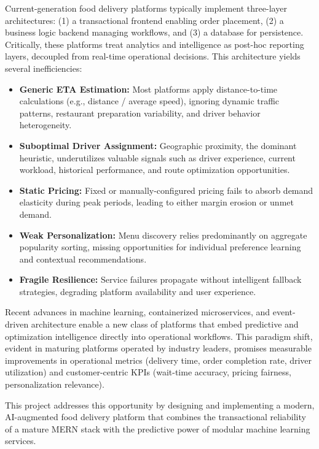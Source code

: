 \documentclass[12pt,a4paper]{report}
\begin{document}
Current-generation food delivery platforms typically implement three-layer architectures: (1) a transactional frontend enabling order placement, (2) a business logic backend managing workflows, and (3) a database for persistence. Critically, these platforms treat analytics and intelligence as post-hoc reporting layers, decoupled from real-time operational decisions. This architecture yields several inefficiencies:

\begin{itemize}
    \item \textbf{Generic ETA Estimation:} Most platforms apply distance-to-time calculations (e.g., distance / average speed), ignoring dynamic traffic patterns, restaurant preparation variability, and driver behavior heterogeneity.
    \item \textbf{Suboptimal Driver Assignment:} Geographic proximity, the dominant heuristic, underutilizes valuable signals such as driver experience, current workload, historical performance, and route optimization opportunities.
    \item \textbf{Static Pricing:} Fixed or manually-configured pricing fails to absorb demand elasticity during peak periods, leading to either margin erosion or unmet demand.
    \item \textbf{Weak Personalization:} Menu discovery relies predominantly on aggregate popularity sorting, missing opportunities for individual preference learning and contextual recommendations.
    \item \textbf{Fragile Resilience:} Service failures propagate without intelligent fallback strategies, degrading platform availability and user experience.
\end{itemize}

Recent advances in machine learning, containerized microservices, and event-driven architecture enable a new class of platforms that embed predictive and optimization intelligence directly into operational workflows. This paradigm shift, evident in maturing platforms operated by industry leaders, promises measurable improvements in operational metrics (delivery time, order completion rate, driver utilization) and customer-centric KPIs (wait-time accuracy, pricing fairness, personalization relevance).

This project addresses this opportunity by designing and implementing a modern, AI-augmented food delivery platform that combines the transactional reliability of a mature MERN stack with the predictive power of modular machine learning services.
\end{document}
